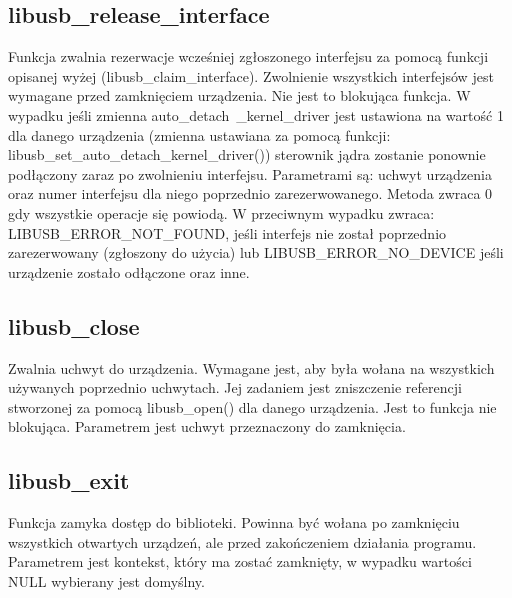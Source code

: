 \documentclass{BscUS}
\begin{document}
\subsection{libusb\_release\_interface}
\noindent Funkcja zwalnia rezerwacje wcześniej zgłoszonego interfejsu za pomocą funkcji opisanej wyżej (libusb\_claim\_interface).
Zwolnienie wszystkich interfejsów jest wymagane przed zamknięciem urządzenia.
Nie jest to blokująca funkcja.
W wypadku jeśli zmienna auto\_detach\ \newline \_kernel\_driver jest ustawiona na wartość 1 dla danego urządzenia (zmienna ustawiana za pomocą funkcji: libusb\_set\_auto\_detach\_kernel\_driver()) sterownik jądra zostanie ponownie podłączony zaraz po zwolnieniu interfejsu.
Parametrami są: uchwyt urządzenia oraz numer interfejsu dla niego poprzednio zarezerwowanego.
\newline
Metoda zwraca 0 gdy wszystkie operacje się powiodą.
W przeciwnym wypadku zwraca: LIBUSB\_ERROR\_NOT\_FOUND, jeśli interfejs nie został poprzednio zarezerwowany (zgłoszony do użycia) lub LIBUSB\_ERROR\_NO\_DEVICE jeśli urządzenie zostało odłączone oraz inne.
\subsection{libusb\_close}
\noindent Zwalnia uchwyt do urządzenia.
Wymagane jest, aby była wołana na wszystkich używanych poprzednio uchwytach.
Jej zadaniem jest zniszczenie referencji stworzonej za pomocą libusb\_open() dla danego urządzenia.
Jest to funkcja nie blokująca.
Parametrem jest uchwyt przeznaczony do zamknięcia.

\subsection{libusb\_exit}
\noindent Funkcja zamyka dostęp do biblioteki.
Powinna być wołana po zamknięciu wszystkich otwartych urządzeń, ale przed zakończeniem działania programu.
Parametrem jest kontekst, który ma zostać zamknięty, w wypadku wartości NULL wybierany jest domyślny.
\end{document}
